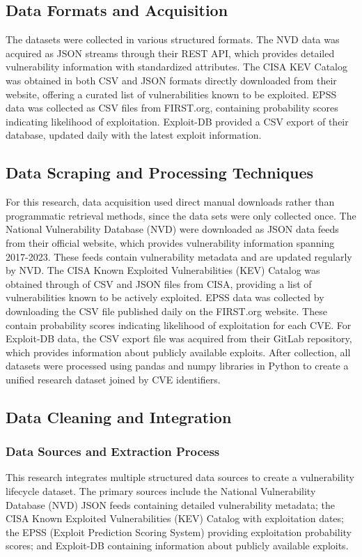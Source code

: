 \documentclass[runningheads]{llncs}
\begin{document}
\subsection{Data Formats and Acquisition}
The datasets were collected in various structured formats. The NVD data was acquired as JSON streams through their REST API, which provides detailed vulnerability information with standardized attributes. The CISA KEV Catalog was obtained in both CSV and JSON formats directly downloaded from their website, offering a curated list of vulnerabilities known to be exploited. EPSS data was collected as CSV files from FIRST.org, containing probability scores indicating likelihood of exploitation. Exploit-DB provided a CSV export of their database, updated daily with the latest exploit information.

\subsection{Data Scraping and Processing Techniques}
For this research, data acquisition used direct manual downloads rather than programmatic retrieval methods, since the data sets were only collected once. The National Vulnerability Database (NVD) were downloaded as JSON data feeds from their official website, which provides vulnerability information spanning 2017-2023. These feeds contain vulnerability metadata and are updated regularly by NVD. The CISA Known Exploited Vulnerabilities (KEV) Catalog was obtained through of CSV and JSON files from CISA, providing a list of vulnerabilities known to be actively exploited. EPSS data was collected by downloading the CSV file published daily on the FIRST.org website. These contain probability scores indicating likelihood of exploitation for each CVE. For Exploit-DB data, the CSV export file was acquired from their GitLab repository, which provides information about publicly available exploits. After collection, all datasets were processed using pandas and numpy libraries in Python to create a unified research dataset joined by CVE identifiers.

\subsection{Data Cleaning and Integration}

\subsubsection{Data Sources and Extraction Process}
This research integrates multiple structured data sources to create a vulnerability lifecycle dataset. The primary sources include the National Vulnerability Database (NVD) JSON feeds containing detailed vulnerability metadata; the CISA Known Exploited Vulnerabilities (KEV) Catalog with exploitation dates; the EPSS (Exploit Prediction Scoring System) providing exploitation probability scores; and Exploit-DB containing information about publicly available exploits.
\end{document}
